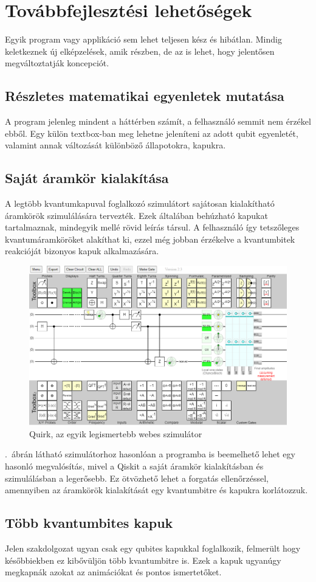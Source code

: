 \documentclass[
]{thesis-ekf}
\theoremstyle{definition}
\theoremstyle{remark}
\begin{document}
\section{Továbbfejlesztési lehetőségek}
Egyik program vagy applikáció sem lehet teljesen kész és hibátlan. Mindig keletkeznek új elképzelések, amik részben, de az is lehet, hogy jelentősen megváltoztatják koncepciót.
\subsection{Részletes matematikai egyenletek mutatása}
A program jelenleg mindent a háttérben számít, a felhasználó semmit nem érzékel ebből. Egy külön textbox-ban meg lehetne jeleníteni az adott qubit egyenletét, valamint annak változását különböző állapotokra, kapukra.

\subsection{Saját áramkör kialakítása}
A legtöbb kvantumkapuval foglalkozó szimulátort sajátosan kialakítható áramkörök szimulálására tervezték. Ezek általában behúzható kapukat tartalmaznak, mindegyik mellé rövid leírás társul. A felhasználó így tetszőleges kvantumáramköröket alakíthat ki, ezzel még jobban érzékelve a kvantumbitek reakcióját bizonyos kapuk alkalmazására.

\begin{figure}[H]
	\centering
	\includegraphics[width=0.5\linewidth]{Simulation}
	\caption{Quirk, az egyik legismertebb webes szimulátor}
	\label{fig:simulation}
\end{figure}

\Az{\ref{fig:simulation}}.~ábrán látható szimulátorhoz hasonlóan a programba is beemelhető lehet egy hasonló megvalósítás, mivel a Qiskit a saját áramkör kialakításban és szimulálásban a legerősebb. Ez ötvözhető lehet a forgatás ellenőrzéssel, amennyiben az áramkörök kialakítását egy kvantumbitre és kapukra korlátozzuk.

\subsection{Több kvantumbites kapuk}
Jelen szakdolgozat ugyan csak egy qubites kapukkal foglalkozik, felmerült hogy későbbiekben ez kibővüljön több kvantumbitre is. Ezek a kapuk ugyanúgy megkapnák azokat az animációkat és pontos ismertetőket.
\end{document}
